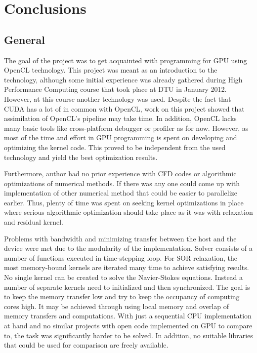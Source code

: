 \chapter{Conclusions}
\section{General}
The goal of the project was to get acquainted with programming for GPU using OpenCL technology. This project was meant as an introduction to the technology, although some initial experience was already gathered during High Performance Computing course that took place at DTU in January 2012. However, at this course another technology was used. Despite the fact that CUDA has a lot of in common with OpenCL, work on this project showed that assimilation of OpenCL's pipeline may take time. In addition, OpenCL lacks many basic tools like cross-platform debugger or profiler as for now. However, as most of the time and effort in GPU programming is spent on developing and optimizing the kernel code. This proved to be independent from the used technology and yield the best optimization results.

Furthermore, author had no prior experience with CFD codes or algorithmic optimizations of numerical methods. If there was any one could come up with implementation of other numerical method that could be easier to parallelize earlier. Thus, plenty of time was spent on seeking kernel optimizations in place where serious algorithmic optimization should take place as it was with relaxation and residual kernel.

Problems with bandwidth and minimizing transfer between the host and the device were met due to the modularity of the implementation. Solver consists of a number of functions executed in time-stepping loop. For SOR relaxation, the most memory-bound kernels are iterated many time to achieve satisfying results. No single kernel can be created to solve the Navier-Stokes equations. Instead a number of separate kernels need to initialized and then synchronized. The goal is to keep the memory transfer low and try to keep the occupancy of computing cores high. It may be achieved through using local memory and overlap of memory transfers and computations. With just a sequential CPU implementation at hand and no similar projects with open code implemented on GPU to compare to, the task was significantly harder to be solved. In addition, no suitable libraries that could be used for comparison are freely available.

